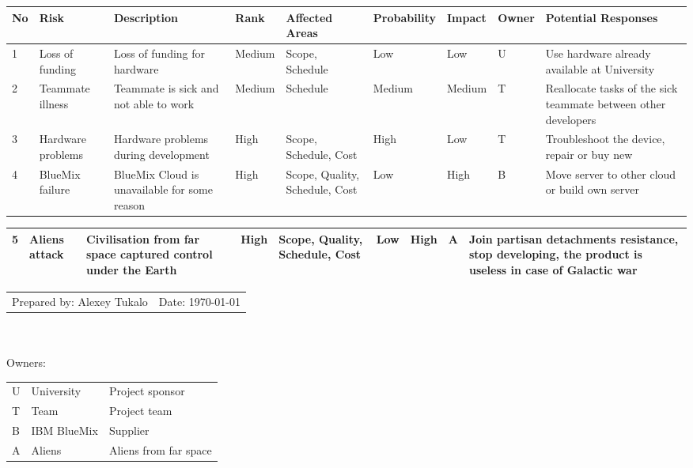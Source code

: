 \documentclass[english]{article}
\begin{document}
\begin{tabular}{|p{0.3cm}|p{2cm}|p{2cm}|p{2cm}|p{2cm}|p{1.5cm}|p{1.2cm}|p{1cm}|p{2cm}|}
  \hline  
No & Risk & Description & Rank & Affected Areas & Probability & Impact & Owner & Potential Responses \\
  \hline  
1 &
Loss of funding &
Loss of funding for hardware & 
Medium & 
Scope, Schedule & 
Low & 
Low & 
U & 
Use hardware already available at University \\
  \hline  
  2 &
Teammate illness &
Teammate is sick and not able to work  & 
Medium & 
Schedule & 
Medium & 
Medium & 
T & 
Reallocate tasks of the sick teammate between other developers \\
\hline
    3 &
Hardware problems &
Hardware problems during development & 
High & 
Scope, Schedule, Cost & 
High & 
Low & 
T & 
Troubleshoot the device, repair or buy new\\
  \hline  

      4 &
BlueMix failure &
BlueMix Cloud is unavailable for some reason  & 
High & 
Scope, Quality, Schedule, Cost & 
Low & 
High & 
B & 
Move server to other cloud or build own server\\
  \hline  

  
\end{tabular}
\begin{tabular}{|p{0.3cm}|p{2cm}|p{2cm}|p{2cm}|p{2cm}|p{1.5cm}|p{1.2cm}|p{1cm}|p{2cm}|}

  \hline 
 5 &
Aliens attack &
Civilisation from far space captured control under the Earth & 
High & 
Scope, Quality, Schedule, Cost & 
Low & 
High & 
A & 
Join partisan detachments resistance, stop developing, the product is useless in case of Galactic war \\
  \hline 
  \end{tabular}
\begin{tabular}{ l l}
\\
Prepared by: Alexey Tukalo & Date: \today \\

\end{tabular}\\\\
Owners:\\
\begin{tabular}{l l l}
U & University & Project sponsor\\
T & Team & Project team\\
B & IBM BlueMix & Supplier\\
A & Aliens & Aliens from far space\\
\end{tabular}
\end{document}
